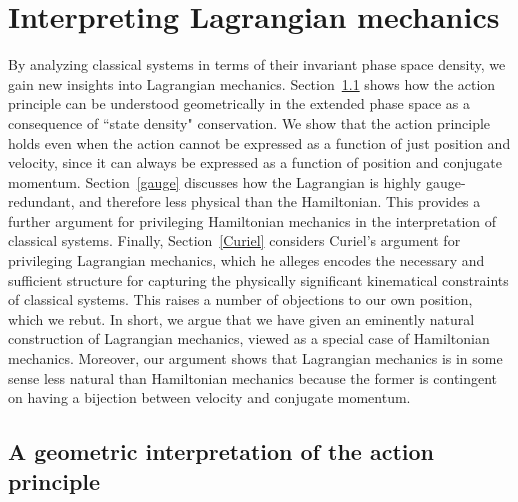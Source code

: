 \documentclass[letterpaper]{article}
\begin{document}


\section{Interpreting Lagrangian mechanics}
\label{Lagrangian}

By analyzing classical systems in terms of their invariant phase space density, we gain new insights into Lagrangian mechanics. Section~\ref{action} shows how the action principle can be understood geometrically in the extended phase space as a consequence of ``state density" conservation. We show that the action principle holds even when the action cannot be expressed as a function of just position and velocity, since it can always be expressed as a function of position and conjugate momentum. Section~\ref{gauge} discusses how the Lagrangian is highly gauge-redundant, and therefore less physical than the Hamiltonian. This provides a further argument for privileging Hamiltonian mechanics in the interpretation of classical systems. Finally, Section~\ref{Curiel} considers Curiel's \parencites*[]{Curiel} argument for privileging Lagrangian mechanics, which he alleges encodes the necessary and sufficient structure for capturing the physically significant kinematical constraints of classical systems. This raises a number of objections to our own position, which we rebut. In short, we argue that we have given an eminently natural construction of Lagrangian mechanics, viewed as a special case of Hamiltonian mechanics. Moreover, our argument shows that Lagrangian mechanics is in some sense less natural than Hamiltonian mechanics because the former is contingent on having a bijection between velocity and conjugate momentum.


\subsection{A geometric interpretation of the action principle}
\label{action}
\end{document}
